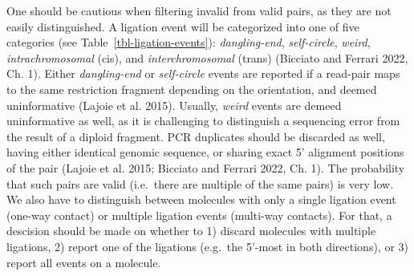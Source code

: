 \documentclass[
  11pt,
  a4paper,
]{scrbook}
\begin{document}
One should be cautious when filtering invalid from valid pairs, as they
are not easily distinguished. A ligation event will be categorized into
one of five categories (see Table~\ref{tbl-ligation-events}):
\emph{dangling-end}, \emph{self-circle}, \emph{weird},
\emph{intrachromosomal} (cis), and \emph{interchromosomal} (trans)
(Bicciato and Ferrari 2022, Ch. 1). Either \emph{dangling-end} or
\emph{self-circle} events are reported if a read-pair maps to the same
restriction fragment depending on the orientation, and deemed
uninformative (Lajoie et al. 2015). Usually, \emph{weird} events are
demeed uninformative as well, as it is challenging to distinguish a
sequencing error from the result of a diploid fragment. PCR duplicates
should be discarded as well, having either identical genomic sequence,
or sharing exact 5' alignment positions of the pair (Lajoie et al. 2015;
Bicciato and Ferrari 2022, Ch. 1). The probability that such pairs are
valid (i.e.~there are multiple of the same pairs) is very low. We also
have to distinguish between molecules with only a single ligation event
(one-way contact) or multiple ligation events (multi-way contacts). For
that, a descision should be made on whether to 1) discard molecules with
multiple ligations, 2) report one of the ligations (e.g.~the 5'-most in
both directions), or 3) report all events on a molecule.
\end{document}
